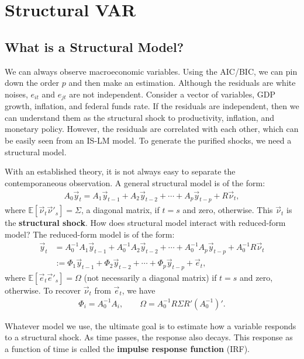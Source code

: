 \documentclass[12pt]{article}
\begin{document}
\section{Structural VAR}
\subsection{What is a Structural Model?}
We can always observe macroeconomic variables. Using the AIC/BIC, we can pin down the order $p$ and then make an estimation. Although the residuals are white noises, $e_{it}$ and $e_{jt}$ are not independent. Consider a vector of variables, GDP growth, inflation, and federal funds rate. If the residuals are independent, then we can understand them as the structural shock to productivity, inflation, and monetary policy. However, the residuals are correlated with each other, which can be easily seen from an IS-LM model. To generate the purified shocks, we need a structural model.

With an established theory, it is not always easy to separate the contemporaneous observation. A general structural model is of the form:
\begin{align*}
    A_0 \vec{y}_t = A_1 \vec{y}_{t-1} + A_2 \vec{y}_{t-2} + \cdots + A_p \vec{y}_{t-p} + R \vec{\nu}_t,
\end{align*}
where $\mathbb{E}[\vec{\nu}_t \vec{\nu}'_s] = \Sigma$, a diagonal matrix, if $t=s$ and zero, otherwise. This $\vec{\nu}_t$ is the \textbf{structural shock}. How does structural model interact with reduced-form model? The reduced-form model is of the form:
\begin{align*}
    \vec{y}_t &= A_0^{-1} A_1 \vec{y}_{t-1} + A_0^{-1} A_2 \vec{y}_{t-2} + \cdots + A_0^{-1} A_p \vec{y}_{t-p} + A_0^{-1}R \vec{\nu}_t\\
    &:= \Phi_1 \vec{y}_{t-1} + \Phi_2 \vec{y}_{t-2} + \cdots + \Phi_p \vec{y}_{t-p} + \vec{e}_t,
\end{align*}
where $\mathbb{E}[\vec{e}_t \vec{e}'_s] = \Omega$ (not necessarily a diagonal matrix) if $t=s$ and zero, otherwise. To recover $\vec{\nu}_t$ from $\vec{e}_t$, we have
\begin{align*}
    \Phi_i = A_0^{-1} A_i, \qquad \Omega = A_0^{-1} R \Sigma R' (A_0^{-1})'.
\end{align*}

Whatever model we use, the ultimate goal is to estimate how a variable responds to a structural shock. As time passes, the response also decays. This response as a function of time is called the \textbf{impulse response function} (IRF).
\end{document}
